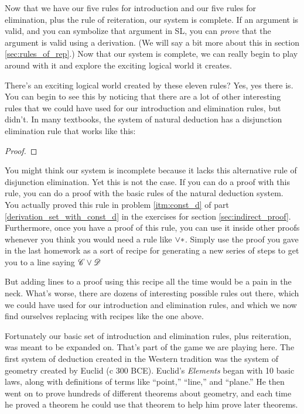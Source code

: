 {%

Now that we have our five rules for introduction and our five rules for elimination, plus the rule of reiteration, our system is complete. If an argument is valid, and you can symbolize 
that argument in SL, you can \emph{prove} that the argument is valid using a derivation. (We will say a bit more about this in section \ref{sec:rules_of_rep}.) Now that our system is 
complete, we can really begin to play around with it and explore the exciting logical world it creates.

There's an exciting logical world created by these eleven rules? Yes, yes there is. You can begin to see this by noticing that there are a lot of other interesting rules that we could 
have used for our introduction and elimination rules, but didn't. In many textbooks, the system of natural deduction has a disjunction elimination rule that works like this:

\begin{proof}
	 
\end{proof}

You might think our system is incomplete because it lacks this alternative rule of disjunction elimination. Yet this is not the case. If you can do a proof with this rule, you can do a 
proof with the basic rules of the natural deduction system. You actually proved this rule in problem \ref{itm:const_d} of part \ref{derivation_set_with_const_d} in the exercises for 
section \ref{sec:indirect_proof}. Furthermore, once you have a proof of this rule, you can use it inside other proofs whenever you think you would need a rule like $\vee \ast$. Simply use 
the proof you gave in the last homework as a sort of recipe for generating a new series of steps to get you to a line saying $\mathscr{C} \vee \mathscr{D}$

But adding lines to a proof using this recipe all the time would be a pain in the neck. What's worse, there are dozens of interesting possible rules out there, which we could have used 
for our introduction and elimination rules, and which we now find ourselves replacing with recipes like the one above.

Fortunately our basic set of introduction and elimination rules, plus reiteration, was meant to be expanded on. That's part of the game we are playing here. The first system of deduction 
created in the Western tradition was the system of geometry created by Euclid (c 300 BCE). Euclid's \emph{Elements} began with 10 basic laws, along with definitions of terms like 
``point,'' ``line,'' and ``plane.'' He then went on to prove hundreds of different theorems about geometry, and each time he proved a theorem he could use that theorem to help him prove 
later theorems.

}
